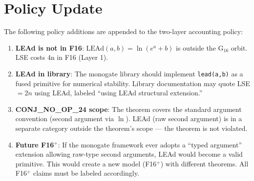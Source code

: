 \documentclass[11pt]{article}
\begin{document}
\section{Policy Update}

The following policy additions are appended to the two-layer accounting policy:

\begin{enumerate}
  \item \textbf{LEAd is not in F16}: $\mathrm{LEAd}(a,b) = \ln(e^a+b)$ is outside
    the G$_{16}$ orbit. LSE costs 4n in F16 (Layer 1).
  \item \textbf{LEAd in library}: The monogate library should implement
    \texttt{lead(a,b)} as a fused primitive for numerical stability. Library
    documentation may quote LSE $= 2n$ using LEAd, labeled
    ``using LEAd structural extension.''
  \item \textbf{CONJ\_NO\_OP\_24 scope}: The theorem covers the standard
    argument convention (second argument via $\ln$). LEAd (raw second argument)
    is in a separate category outside the theorem's scope — the theorem is not violated.
  \item \textbf{Future F16$^+$}: If the monogate framework ever adopts a
    ``typed argument'' extension allowing raw-type second arguments, LEAd would
    become a valid primitive. This would create a new model (F16$^+$) with different
    theorems. All F16$^+$ claims must be labeled accordingly.
\end{enumerate}
\end{document}
